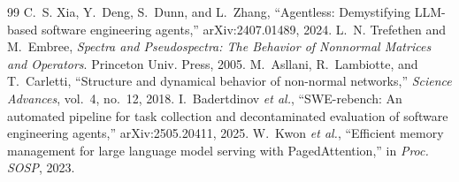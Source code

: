 \documentclass[conference]{IEEEtran}
\begin{document}
\begin{thebibliography}{99}
 C.~S. Xia, Y.~Deng, S.~Dunn, and L.~Zhang, ``Agentless: Demystifying LLM-based software engineering agents,'' arXiv:2407.01489, 2024.
 L.~N. Trefethen and M.~Embree, \emph{Spectra and Pseudospectra: The Behavior of Nonnormal Matrices and Operators}. Princeton Univ. Press, 2005.
 M.~Asllani, R.~Lambiotte, and T.~Carletti, ``Structure and dynamical behavior of non-normal networks,'' \emph{Science Advances}, vol.~4, no.~12, 2018.
 I.~Badertdinov \emph{et al.}, ``SWE-rebench: An automated pipeline for task collection and decontaminated evaluation of software engineering agents,'' arXiv:2505.20411, 2025.
 W.~Kwon \emph{et al.}, ``Efficient memory management for large language model serving with PagedAttention,'' in \emph{Proc. SOSP}, 2023.
\end{thebibliography}
\end{document}
